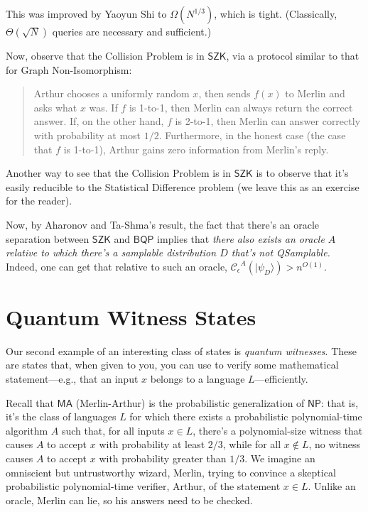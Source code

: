 \documentclass[11pt]{report}
\theoremstyle{plain}
\theoremstyle{definition}
\renewcommand{\ket}[1]{|#1\rangle}
\newcommand{\sizee}{\ensuremath{\mathcal{C}_\epsilon}}
\begin{document}
This was improved by Yaoyun Shi \cite{shi} to $\Omega(N^{1/3})$, which is tight.  (Classically, $\Theta(\sqrt{N})$ queries are necessary and sufficient.)

Now, observe that the Collision Problem is in $\mathsf{SZK}$, via a protocol similar to that for Graph Non-Isomorphism:
\begin{quote}
Arthur chooses a uniformly random $x$, then sends $f(x)$ to Merlin and asks what $x$ was.  If $f$ is 1-to-1, then Merlin can always return the correct answer.
If, on the other hand, $f$ is 2-to-1, then Merlin can answer correctly with probability at most $1/2$.  Furthermore, in the honest case (the case that $f$ is 1-to-1), Arthur gains zero information from Merlin's reply.
\end{quote}

Another way to see that the Collision Problem is in $\mathsf{SZK}$ is to observe that it's easily reducible to the Statistical Difference problem (we leave this as an exercise for the reader).

Now, by Aharonov and Ta-Shma's result, the fact that there's an oracle separation between $\mathsf{SZK}$ and $\mathsf{BQP}$ implies that {\em there also exists an oracle $A$ relative to which there's a samplable distribution $D$ that's not QSamplable.}  Indeed, one can get that relative to such an oracle, $\sizee^A(\ket{\psi_D})>n^{O(1)}$.


\section{Quantum Witness States}

Our second example of an interesting class of states is {\em quantum witnesses}. These are states that, when given to you, you can use to verify some mathematical statement---e.g., that an input $x$ belongs to a language $L$---efficiently.

Recall that $\mathsf{MA}$ (Merlin-Arthur) is the probabilistic generalization of $\mathsf{NP}$: that is, it's the class of languages $L$ for which there exists
a probabilistic polynomial-time algorithm $A$ such that, for all inputs $x\in L$, there's a polynomial-size witness that causes $A$ to accept $x$ with probability at least $2/3$, while for all $x\not\in L$, no witness causes $A$ to accept $x$ with probability greater than $1/3$.  We imagine an omniscient but untrustworthy wizard, Merlin, trying to convince a skeptical probabilistic polynomial-time verifier, Arthur, of the statement $x\in L$. Unlike an oracle, Merlin can lie, so his answers
need to be checked.
\end{document}
